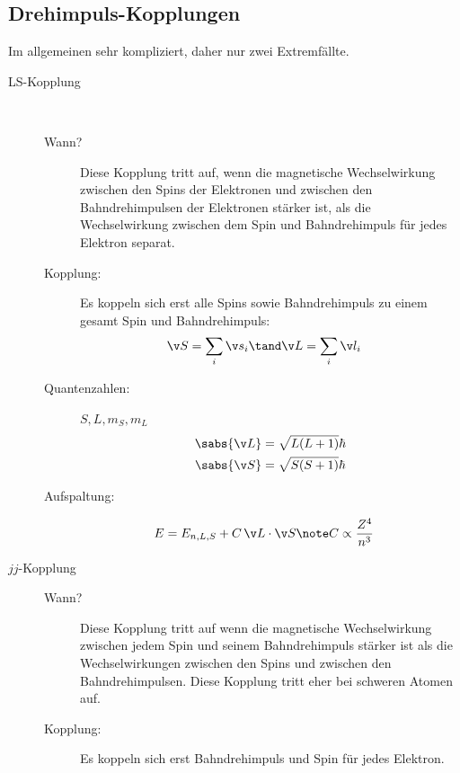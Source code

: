 \documentclass[twocolumn]{summery_4.1}
\begin{document}
\subsection{Drehimpuls-Kopplungen}
Im allgemeinen sehr kompliziert, daher nur zwei Extremfällte.
\begin{description}
    \item[LS-Kopplung]\,\vspace{-2mm}
    
    \begin{description}
        \item[Wann?] Diese Kopplung tritt auf, wenn die magnetische Wechselwirkung zwischen den Spins der Elektronen
        und zwischen den Bahndrehimpulsen der Elektronen stärker ist, als die Wechselwirkung zwischen dem
        Spin und Bahndrehimpuls für jedes Elektron separat.
        \item[Kopplung:]
        Es koppeln sich erst alle Spins sowie Bahndrehimpuls zu einem gesamt Spin und Bahndrehimpuls:
        \begin{align*}
            \v S &= \sum_i \v s_i \tand \v L =\sum_i \v l_i 
        \end{align*} 
        \item[Quantenzahlen:] \(S,L,m_S, m_L \)
        \begin{align*}
            \sabs{\v L} &= \sqrt{L(L+1)}\hbar\\
            \sabs{\v S} &= \sqrt{S(S+1)}\hbar
        \end{align*} 
        \item[Aufspaltung:]\vspace{-1mm}
        \begin{align*}
            E &= E_{n,L,S} + C \,\v L \cdot \v S \note C\propto \frac{Z^4}{n^3}
        \end{align*}
    \end{description}
    \item[$jj$-Kopplung]
    \begin{description}
        \item[Wann?] Diese Kopplung tritt auf wenn die magnetische Wechselwirkung zwischen jedem Spin und seinem
        Bahndrehimpuls stärker ist als die Wechselwirkungen zwischen den Spins und zwischen den Bahndrehimpulsen. Diese Kopplung tritt eher bei schweren Atomen auf. 
        \item[Kopplung:]
        Es koppeln sich erst Bahndrehimpuls und Spin für jedes Elektron.
        \begin{align*}

\end{align*}
\end{description}
\end{description}
\end{document}
